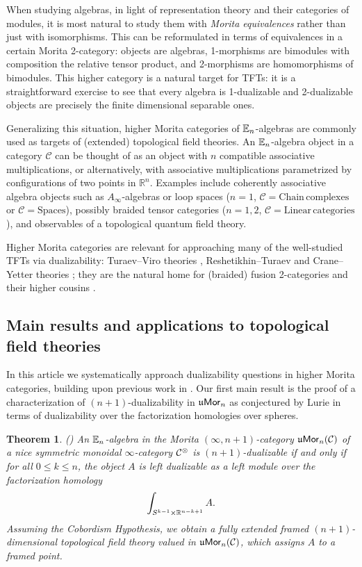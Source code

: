 \documentclass[10pt, reqno, twoside
, final
]{amsart}
\numberwithin{equation}{subsection}%
\newtheorem{thmx}{Theorem}
\theoremstyle{definition}
\theoremstyle{definition}
\theoremstyle{definition}
\theoremstyle{definition}
\theoremstyle{definition}
\theoremstyle{definition}
\theoremstyle{definition}
\theoremstyle{definition}
\theoremstyle{definition}
\theoremstyle{plain}
\theoremstyle{definition}
\theoremstyle{plain}
\theoremstyle{definition}
\theoremstyle{plain}
\theoremstyle{definition}
\theoremstyle{definition}
\theoremstyle{plain}
\theoremstyle{plain}
\theoremstyle{definition}
\theoremstyle{plain}
\theoremstyle{plain}
\theoremstyle{plain}
\begin{document}
When studying algebras, in light of representation theory and their categories of modules, it is most natural to study them with \emph{Morita equivalences} rather than just with isomorphisms.
This can be reformulated in terms of equivalences in a certain Morita 2-category: objects are algebras, 1-morphisms are bimodules with composition the relative tensor product, and 2-morphisms are homomorphisms of bimodules. This higher category is a natural target for TFTs: it is a straightforward exercise to see that every algebra is 1-dualizable and 2-dualizable objects are precisely the finite dimensional separable ones.

Generalizing this situation, higher Morita categories of $\mathbb{E}_n$-algebras are commonly used as targets of (extended) topological field theories.
An $\mathbb{E}_n$-algebra object in a category $\mathcal{C}$ can be thought of as an object with $n$ compatible associative multiplications, or alternatively, with associative multiplications parametrized by configurations of two points in $\mathbb{R}^n$.
Examples include coherently associative algebra objects such as $A_\infty$-algebras or loop spaces ($n=1$, $\mathcal{C}=\mathrm{Chain}\,\mathrm{complexes}$ or $\mathcal{C}=\mathrm{Spaces}$), possibly braided tensor categories ($n=1, 2$, $\mathcal{C}=\mathrm{Linear}\,\mathrm{categories}$), and observables of a topological quantum field theory.

Higher Morita categories are relevant for approaching many of the well-studied TFTs via dualizability: Turaev--Viro theories \cite{DSPS,BJS}, Reshetikhin--Turaev and Crane--Yetter theories \cite{BJS,BJSS,Haioun,Kinnear,FST}; they are the natural home for (braided) fusion 2-categories and  their higher cousins \cite{DouglasReutter, Decoppet_dualizability, classificationfusion2cat, Decoppet_relative}.

\subsection{Main results and applications to topological field theories}

In this article we systematically approach dualizability questions in higher Morita categories, building upon previous work in \cite{GS}.
Our first main result is the proof of a characterization of $(n+1)$-dualizability in $\mathfrak{u}\mathsf{Mor}_n$ as conjectured by Lurie \cite[Remark 4.1.27]{LurieCobordism} in terms of dualizability over the factorization homologies over spheres.
\begin{thmx}\label{thmx:mainthm}
    ()
An $\mathbb{E}_n$-algebra
in the Morita $(\infty,n+1)$-category $\mathfrak{u}\mathsf{Mor}_n(\mathcal{C})$ of a nice symmetric monoidal $\infty$-category $\mathcal{C}^{\otimes}$ is $(n+1)$-dualizable if and only if for all $0\leq k\leq n$, the object $A$ is left dualizable as a left module over the factorization homology 
\[  \int_{S^{k-1}\times \mathbb{R}^{n-k+1}}A. \]
Assuming the Cobordism Hypothesis, we obtain a fully extended framed $(n+1)$-dimensional topological field theory 
valued in $\mathfrak{u}\mathsf{Mor}_n(\mathcal{C})$, which assigns $A$ to a framed point.
\end{thmx}
\end{document}
